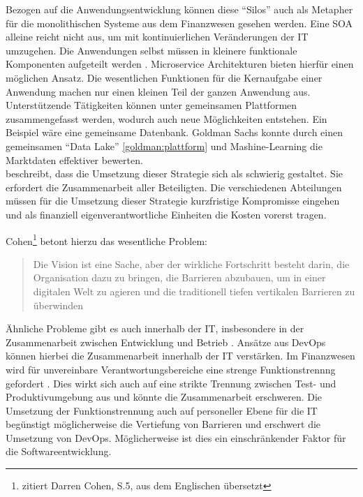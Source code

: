 Bezogen auf die Anwendungsentwicklung können diese \enquote{Silos} auch als Metapher für die monolithischen Systeme \cite{Bussmann2006} aus dem Finanzwesen gesehen werden. Eine \ac{SOA} alleine reicht nicht aus, um mit kontinuierlichen Veränderungen der IT umzugehen. Die Anwendungen selbst müssen in kleinere funktionale Komponenten aufgeteilt werden \cite{Bussmann2006}. Microservice Architekturen bieten hierfür einen möglichen Ansatz. Die wesentlichen Funktionen für die Kernaufgabe einer Anwendung machen nur einen kleinen Teil der ganzen Anwendung aus. Unterstützende Tätigkeiten können unter gemeinsamen Plattformen zusammengefasst werden, wodurch auch neue Möglichkeiten entstehen. Ein Beispiel wäre eine gemeinsame Datenbank. Goldman Sachs konnte durch einen gemeinsamen \enquote{Data Lake} \ref{goldman:plattform} und Mashine-Learning die Marktdaten effektiver bewerten.
\medskip
\\
\citet{Gupta:2017} beschreibt, dass die Umsetzung dieser Strategie sich als schwierig gestaltet. Sie erfordert die Zusammenarbeit aller Beteiligten. Die verschiedenen Abteilungen müssen für die Umsetzung dieser Strategie kurzfristige Kompromisse eingehen und als finanziell eigenverantwortliche Einheiten die Kosten vorerst tragen. 

Cohen\footnote{\citet{Gupta:2017} zitiert Darren Cohen, S.5, aus dem Englischen übersetzt} betont hierzu das wesentliche Problem:
\begin{quote}\label{quote:goldman-vision}
    Die Vision ist eine Sache, aber der wirkliche Fortschritt besteht darin, die Organisation dazu zu bringen, die Barrieren abzubauen, um in einer digitalen Welt zu agieren und die traditionell tiefen vertikalen Barrieren zu überwinden
\end{quote}
\medskip
Ähnliche Probleme gibt es auch innerhalb der IT, insbesondere in der Zusammenarbeit zwischen Entwicklung und Betrieb \citet{Disterer2013}. Ansätze aus DevOps \cite{Alt2017} können hierbei die Zusammenarbeit innerhalb der IT verstärken. Im Finanzwesen wird für unvereinbare Verantwortungsbereiche eine strenge Funktionstrennng gefordert \cite{MaRisk:2017}.
Dies wirkt sich auch auf eine strikte Trennung zwischen Test- und Produktivumgebung aus \citet{MaRisk:2017} und könnte die Zusammenarbeit erschweren. Die Umsetzung der Funktionstrennung auch auf personeller Ebene für die IT begünstigt möglicherweise die Vertiefung von Barrieren und erschwert die Umsetzung von DevOps. Möglicherweise ist dies ein einschränkender Faktor für die Softwareentwicklung.

